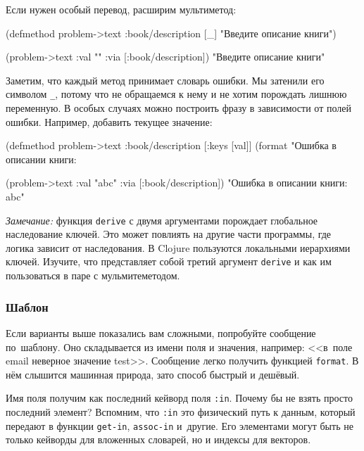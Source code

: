 \noindent
Если нужен особый перевод, расширим мультиметод:

  \begin{clojure}
(defmethod problem->text :book/description [_]
  "Введите описание книги")

(problem->text {:val "" :via [:book/description]})
"Введите описание книги"
  \end{clojure}


Заметим, что каждый метод принимает словарь ошибки. Мы затенили его символом
\verb|_|, потому что не обращаемся к нему и не хотим порождать лишнюю
переменную. В особых случаях можно построить фразу в зависимости от полей
ошибки. Например, добавить текущее значение:

  \begin{clojure}
(defmethod problem->text :book/description
  [{:keys [val]}]
  (format "Ошибка в описании книги: %

(problem->text {:val "abc" :via [:book/description]})
"Ошибка в описании книги: abc"
  \end{clojure}

\emph{Замечание:} функция \verb|derive| с двумя аргументами порождает
глобальное наследование ключей. Это может повлиять на другие части программы,
где логика зависит от наследования. В Clojure пользуются локальными иерархиями
ключей. Изучите, что представляет собой третий аргумент \verb|derive| и как им
пользоваться в паре с мульмитеметодом.

\subsubsection{Шаблон}


Если варианты выше показались вам сложными, попробуйте сообщение по~шаблону. Оно
складывается из имени поля и значения, например: <<в~поле email неверное
значение test>>. Сообщение легко получить функцией \verb|format|. В нём
слышится машинная природа, зато способ быстрый и дешёвый.

Имя поля получим как последний кейворд поля \verb|:in|. Почему бы не взять
просто последний элемент? Вспомним, что \verb|:in| это физический путь к данным,
который передают в функции \verb|get-in|, \verb|assoc-in| и~другие. Его
элементами могут быть не только кейворды для вложенных словарей, но и индексы
для векторов.

